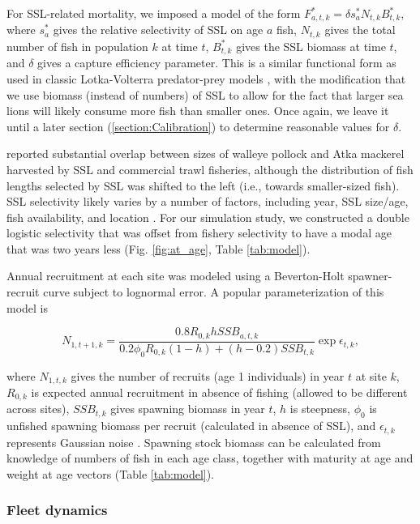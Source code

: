 \documentclass[11pt]{article}
\begin{document}
For SSL-related mortality, we imposed a model of the form $F_{a,t,k}^*=\delta s_a^* N_{t,k} B_{t,k}^*$, where $s_a^*$ gives the relative selectivity of SSL on age $a$ fish, $N_{t,k}$ gives the total number of fish in population $k$ at time $t$, $B_{t,k}^*$ gives the SSL biomass at time $t$, and $\delta$ gives a capture efficiency parameter. This is a similar functional form as used in classic Lotka-Volterra predator-prey models \citep[see e.g.][]{Gotelli2001}, with the modification that we use biomass (instead of numbers) of SSL to allow for the fact that larger sea lions will likely consume more fish than smaller ones.  Once again, we leave it until a later section (\ref{section:Calibration}) to determine reasonable values for $\delta$.

\citet{ZeppelinEtAl2004} reported substantial overlap between sizes of walleye pollock and Atka mackerel harvested by SSL and commercial trawl fisheries, although the distribution of fish lengths selected by SSL was shifted to the left (i.e., towards smaller-sized fish).  SSL selectivity likely varies by a number of factors, including year, SSL size/age, fish availability, and location \citep{ZeppelinEtAl2004}.  For our simulation study, we constructed a double logistic selectivity that was offset from fishery selectivity to have a modal age that was two years less (Fig. \ref{fig:at_age}, Table \ref{tab:model}).

Annual recruitment at each site was modeled using a Beverton-Holt spawner-recruit curve subject to lognormal error.  A popular parameterization of this model is
\begin{linenomath}
\begin{equation*}
N_{1,t+1,k} = \frac{0.8 R_{0,k} h SSB_{a,t,k}}{0.2 \phi_0 R_{0,k}(1-h)+(h-0.2)SSB_{t,k}} \exp{\epsilon_{t,k}},
\end{equation*}
\end{linenomath}
where $N_{1,t,k}$ gives the number of recruits (age 1 individuals) in year $t$ at site $k$, $R_{0,k}$ is expected annual recruitment in absence of fishing (allowed to be different across sites), $SSB_{t,k}$ gives spawning biomass in year $t$, $h$ is steepness, $\phi_0$ is unfished spawning biomass per recruit (calculated in absence of SSL), and $\epsilon_{t,k}$ represents Gaussian noise \citep{Mace1988}.  Spawning stock biomass can be calculated from knowledge of numbers of fish in each age class, together with maturity at age and weight at age vectors (Table \ref{tab:model}).

\subsubsection{Fleet dynamics}
\label{section:Fleet}
\end{document}
